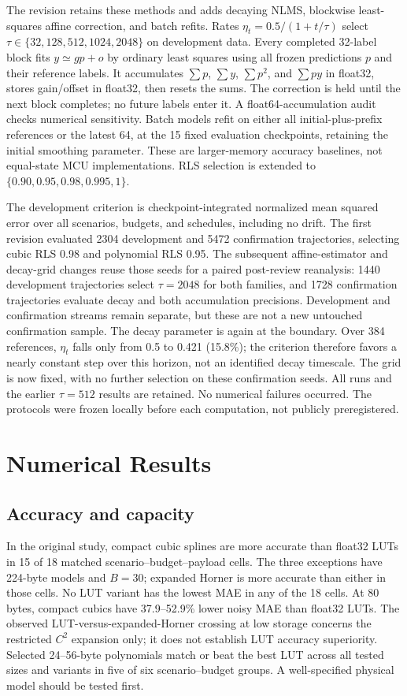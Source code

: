 \documentclass[journal,twoside,web]{ieeecolor}
\begin{document}
The revision retains these methods and adds decaying NLMS, blockwise least-squares affine correction, and batch refits. Rates $\eta_t=0.5/(1+t/\tau)$ select $\tau\in\{32,128,512,1024,2048\}$ on development data. Every completed 32-label block fits $y\simeq gp+o$ by ordinary least squares using all frozen predictions $p$ and their reference labels. It accumulates $\sum p$, $\sum y$, $\sum p^2$, and $\sum py$ in float32, stores gain/offset in float32, then resets the sums. The correction is held until the next block completes; no future labels enter it. A float64-accumulation audit checks numerical sensitivity. Batch models refit on either all initial-plus-prefix references or the latest 64, at the 15 fixed evaluation checkpoints, retaining the initial smoothing parameter. These are larger-memory accuracy baselines, not equal-state MCU implementations. RLS selection is extended to $\{0.90,0.95,0.98,0.995,1\}$.

The development criterion is checkpoint-integrated normalized mean squared error over all scenarios, budgets, and schedules, including no drift. The first revision evaluated 2304 development and 5472 confirmation trajectories, selecting cubic RLS 0.98 and polynomial RLS 0.95. The subsequent affine-estimator and decay-grid changes reuse those seeds for a paired post-review reanalysis: 1440 development trajectories select $\tau=2048$ for both families, and 1728 confirmation trajectories evaluate decay and both accumulation precisions. Development and confirmation streams remain separate, but these are not a new untouched confirmation sample. The decay parameter is again at the boundary. Over 384 references, $\eta_t$ falls only from 0.5 to 0.421 (15.8\%); the criterion therefore favors a nearly constant step over this horizon, not an identified decay timescale. The grid is now fixed, with no further selection on these confirmation seeds. All runs and the earlier $\tau=512$ results are retained. No numerical failures occurred. The protocols were frozen locally before each computation, not publicly preregistered.

\section{Numerical Results}
\subsection{Accuracy and capacity}
\normalcolor
In the original study, compact cubic splines are more accurate than float32 LUTs in 15 of 18 matched scenario--budget--payload cells. The three exceptions have 224-byte models and $B=30$; expanded Horner is more accurate than either in those cells. No LUT variant has the lowest MAE in any of the 18 cells. At 80 bytes, compact cubics have 37.9--52.9\% lower noisy MAE than float32 LUTs. The observed LUT-versus-expanded-Horner crossing at low storage concerns the restricted $C^2$ expansion only; it does not establish LUT accuracy superiority. Selected 24--56-byte polynomials match or beat the best LUT across all tested sizes and variants in five of six scenario--budget groups. A well-specified physical model should be tested first.
\end{document}
